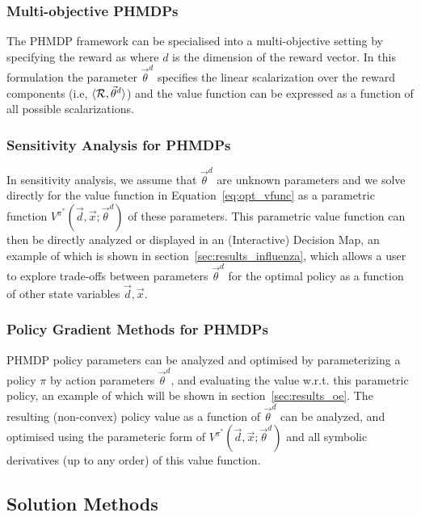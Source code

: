 \subsubsection{Multi-objective PHMDPs}

The PHMDP framework can be specialised into a multi-objective setting
by specifying the reward as {\footnotesize \MORewardFunc} where
{\footnotesize $ d $} is the dimension of the reward vector. In this
formulation the parameter {\footnotesize $ \vec{\theta}^{d} $} specifies the
linear scalarization over the reward components (i.e, {\footnotesize $\langle
\mathcal{R}, \vec{\theta}^{d} \rangle$}) and the value function can be expressed
as a function of all possible scalarizations.

\subsubsection{Sensitivity Analysis for PHMDPs}

In sensitivity analysis, we assume that {\footnotesize $\vec{\theta}^{d}$} are unknown
parameters and we solve directly for the value function in
Equation~\eqref{eq:opt_vfunc} as a parametric function
{\footnotesize $V^{\pi^{*}}(\vec{d}, \vec{x}; \vec{\theta}^{d})$} of these parameters.  This
parametric value function can then be directly analyzed or displayed in an
(Interactive) Decision Map, an example of which is shown in
section~\ref{sec:results_influenza}, which allows a user to explore
trade-offs between parameters {\footnotesize $\vec{\theta}^{d}$ }for the optimal policy as a
function of other state variables {\footnotesize $\vec{d},\vec{x}$}.

\subsubsection{Policy Gradient Methods for PHMDPs}

PHMDP policy parameters can be analyzed and optimised by parameterizing a policy {\footnotesize $\pi$} by action parameters {\footnotesize $\vec{\theta}^{d}$}, and evaluating the value w.r.t. this parametric policy, an example of which will be shown in section~\ref{sec:results_oe}. The resulting (non-convex) policy value as a function of {\footnotesize $\vec{\theta}^{d}$} can be
analyzed, and optimised using the parameteric form of {\footnotesize $V^{\pi^{*}}(\vec{d}, \vec{x}; \vec{\theta}^{d})$} and all symbolic
derivatives (up to any order) of this value function.

\subsection{Solution Methods}


